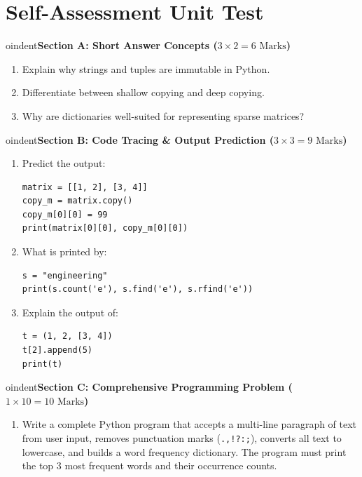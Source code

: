 \section{Self-Assessment Unit Test}

\begin{chaptertest}

oindent\textbf{Section A: Short Answer Concepts ($3 \times 2 = 6\text{ Marks}$)}
\begin{enumerate}
    \item Explain why strings and tuples are immutable in Python.
    \item Differentiate between shallow copying and deep copying.
    \item Why are dictionaries well-suited for representing sparse matrices?
\end{enumerate}

\medskip

oindent\textbf{Section B: Code Tracing \& Output Prediction ($3 \times 3 = 9\text{ Marks}$)}
\begin{enumerate}[start=4]
    \item Predict the output:
    \begin{lstlisting}[language=Python3]
matrix = [[1, 2], [3, 4]]
copy_m = matrix.copy()
copy_m[0][0] = 99
print(matrix[0][0], copy_m[0][0])
    \end{lstlisting}
    \item What is printed by:
    \begin{lstlisting}[language=Python3]
s = "engineering"
print(s.count('e'), s.find('e'), s.rfind('e'))
    \end{lstlisting}
    \item Explain the output of:
    \begin{lstlisting}[language=Python3]
t = (1, 2, [3, 4])
t[2].append(5)
print(t)
    \end{lstlisting}
\end{enumerate}

\medskip

oindent\textbf{Section C: Comprehensive Programming Problem ($1 \times 10 = 10\text{ Marks}$)}
\begin{enumerate}[start=7]
    \item Write a complete Python program that accepts a multi-line paragraph of text from user input, removes punctuation marks (\texttt{.,!?:;}), converts all text to lowercase, and builds a word frequency dictionary. The program must print the top 3 most frequent words and their occurrence counts.
\end{enumerate}
\end{chaptertest}

